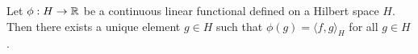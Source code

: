 \begin{theorem}
    \cite[p. 22]{small1994hilbert}
    Let \(\phi : H \to \mathbb{R}\) be a continuous linear functional defined on a Hilbert space \(H\).
    Then there exists a unique element \(g \in H\) such that \(\phi(g) = \langle f, g \rangle_H\) for all \(g \in H\).
\end{theorem}